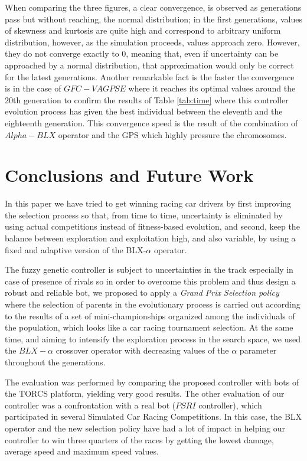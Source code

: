 \documentclass[10pt,journal,compsoc]{IEEEtran}
\begin{document}
When comparing the three figures, a clear convergence, 
is observed as generations pass but without reaching, the normal distribution; in the first
generations, values of skewness and kurtosis are quite
high and correspond to arbitrary uniform distribution, however, as the simulation proceeds, values
approach zero. However, they do not converge
exactly to 0, meaning that, even if uncertainty can be
approached by a normal distribution, that approximation
would only be correct for the latest generations\cite{noisylunch2015}.
Another remarkable fact is the faster the convergence is in the case of $GFC-VAGPSE$ where it reaches its optimal values around the 20th generation to confirm the results of Table \ref{tab:time} where this controller evolution process has given the best individual between the eleventh and the eighteenth generation.
This convergence speed is the result of the combination of $Alpha-BLX$ operator and the GPS which highly pressure the chromosomes.

\section{Conclusions and Future Work} 
\label{sec:conclusions}



In this paper we have tried to get winning racing car drivers by
first improving the selection process so that, from time to time,
uncertainty is eliminated by using actual competitions instead of
fitness-based evolution, and second, keep the balance between
exploration and exploitation high, and also variable, by using a fixed
and adaptive version of the BLX-$\alpha$ operator.

The fuzzy genetic controller is subject to uncertainties in the track especially in case of presence of rivals so in order to overcome this problem and thus design a robust and reliable bot, we proposed to apply a \textit{Grand Prix Selection policy} where the selection of parents in the evolutionary process is carried out according to the results of a set of mini-championships organized among the individuals of the population, which looks like a car racing tournament selection.
At the same time, and aiming to intensify the exploration process in the search space, we used the $BLX-\alpha$ crossover operator with decreasing values of the $\alpha$ parameter throughout the generations.

The evaluation was performed by comparing the proposed controller with bots of the TORCS platform, yielding very good results.
The other evaluation of our controller was a confrontation with a real bot ($PSRI$ controller), which participated in several Simulated Car Racing Competitions. In this case, the BLX operator and the new selection policy have had a lot of impact in helping our controller to win three quarters of the races by getting the lowest damage, average speed and maximum speed values.
\end{document}
